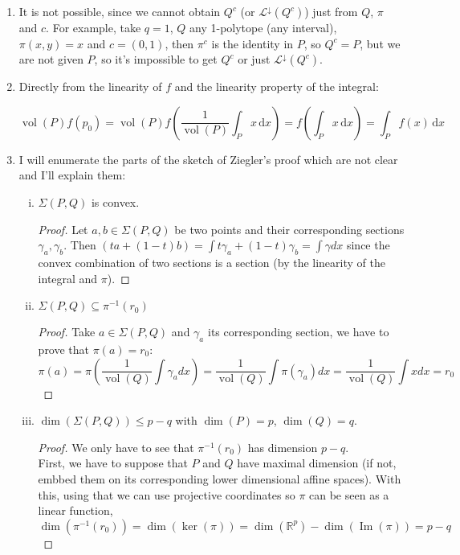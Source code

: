 \documentclass[11pt]{article}
\DeclareMathOperator{\vol}{vol}
\DeclareMathOperator{\im}{Im}
\DeclareMathOperator{\im}{im}
\begin{document}
\begin{enumerate}

\item It is not possible, since we cannot obtain $Q^c$ (or $\mathcal L^\downarrow(Q^c)$) just from $Q$, $\pi$ and $c$. \newline For example, take $q = 1$, $Q$ any 1-polytope (any interval), $\pi(x,y) = x$ and $c = (0,1)$, then $\pi^c$ is the identity in $P$, so $Q^c = P$, but we are not given $P$, so it's impossible to get $Q^c$ or just $\mathcal L^\downarrow(Q^c)$.

\item Directly from the linearity of $f$ and the linearity property of the integral:

\begin{equation*}
	\vol(P) f(p_0)
	= \vol(P) f\left( \frac1{\vol (P)}\int_P x\,\mathrm{d}x \right)
	= f\left(\int_P x\,\mathrm{d}x \right) 
	= \int_P f(x) \,\mathrm{d}x
\end{equation*}

\newpage

\item I will enumerate the parts of the sketch of Ziegler's proof which are not clear and I'll explain them:

\begin{enumerate}[(i)]

\item $\Sigma(P,Q)$ is convex.

\begin{proof}
Let $a,b \in \Sigma(P,Q)$ be two points and their corresponding sections $\gamma_a, \gamma_b$. Then $(ta + (1-t)b) = \int t\gamma_a + (1-t)\gamma_b = \int \gamma dx$ since the convex combination of two sections is a section (by the linearity of the integral and $\pi$).
\end{proof}

\item $\Sigma (P,Q) \subseteq \pi^{-1}(r_0)$

\begin{proof}
Take $a \in \Sigma(P,Q)$ and $\gamma_a$ its corresponding section, we have to prove that $\pi(a) = r_0$:
\[\pi(a) = \pi( \frac{1}{\vol(Q)}\int \gamma_a dx) = \frac{1}{\vol(Q)}\int \pi(\gamma_a) dx = \frac{1}{\vol(Q)} \int x dx = r_0 \]
\end{proof}


\item $\dim(\Sigma(P,Q)) \leq p-q$ with $\dim(P) = p$, $\dim(Q) = q$.

\begin{proof}
We only have to see that $\pi^{-1}(r_0)$ has dimension $p-q$. \\ First, we have to suppose that $P$ and $Q$ have maximal dimension (if not, embbed them on its corresponding lower dimensional affine spaces). With this, using that we can use projective coordinates so $\pi$ can be seen as a linear function, 
\[\dim(\pi^{-1}(r_0)) = \dim(\ker(\pi)) = \dim(\mathbb{R}^p) - \dim(\im(\pi)) = p-q\]
\end{proof}




\end{enumerate}
\end{enumerate}
\end{document}
